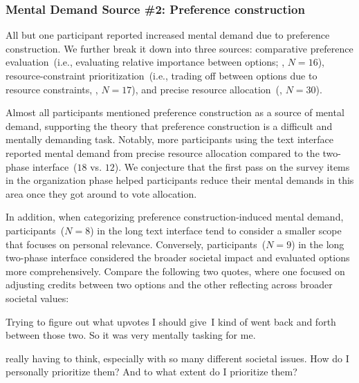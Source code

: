 \subsubsection{Mental Demand Source \#2: Preference construction}
All but one participant reported increased mental demand due to preference construction. We further break it down into three sources: comparative preference evaluation~(i.e., evaluating relative importance between options; , $N=16$), resource-constraint prioritization~(i.e., trading off between options due to resource constraints, , $N=17$), and precise resource allocation~(, $N=30$).

Almost all participants mentioned preference construction as a source of mental demand, supporting the theory that preference construction is a difficult and mentally demanding task. Notably, more participants using the text interface reported mental demand from precise resource allocation compared to the two-phase interface~($18$ vs. $12$). We conjecture that the first pass on the survey items in the organization phase helped participants reduce their mental demands in this area once they got around to vote allocation.

In addition, when categorizing preference construction-induced mental demand, participants~($N=8$) in the long text interface tend to consider a smaller scope that focuses on personal relevance. Conversely, participants~($N=9$) in the long two-phase interface considered the broader societal impact and evaluated options more comprehensively. Compare the following two quotes, where one focused on adjusting credits between two options and the other reflecting across broader societal values:

\begin{displayquote}
Trying to figure out what upvotes I should give~\bracketellipsis I kind of went back and forth between those two. \bracketellipsis So it was very mentally tasking for me. \hfill{}
\end{displayquote}

\begin{displayquote}
\bracketellipsis really having to think, especially with so many different societal issues. How do I personally prioritize them? And to what extent do I prioritize them? \hfill{}
\end{displayquote}

